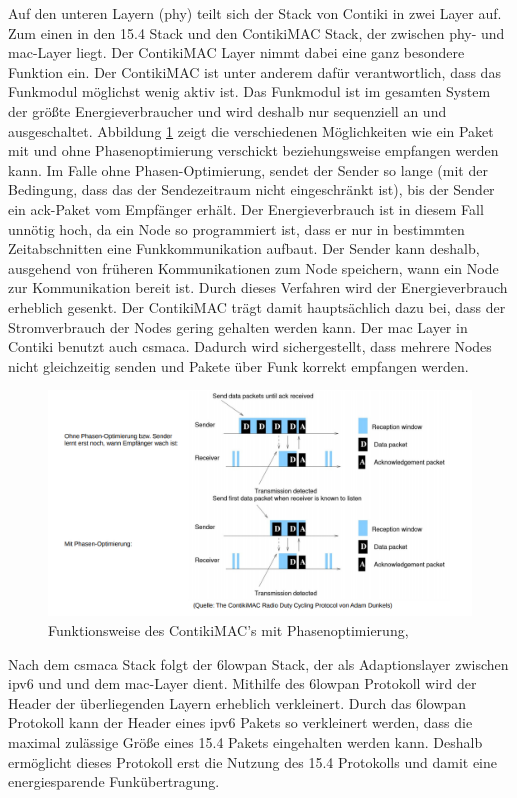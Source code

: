 	Auf den unteren Layern (\ac{phy}) teilt sich der Stack von Contiki in zwei Layer auf. Zum einen in den \ac{15.4} Stack und den ContikiMAC Stack, der zwischen \ac{phy}- und \ac{mac}-Layer liegt. Der ContikiMAC Layer nimmt dabei eine ganz besondere Funktion ein. Der ContikiMAC ist unter anderem dafür verantwortlich, dass das Funkmodul möglichst wenig aktiv ist. Das Funkmodul ist im gesamten System der größte Energieverbraucher und wird deshalb nur sequenziell an und ausgeschaltet. Abbildung \ref{ContikiMAC} zeigt die verschiedenen Möglichkeiten wie ein Paket mit und ohne Phasenoptimierung verschickt beziehungsweise empfangen werden kann. Im Falle ohne Phasen-Optimierung, sendet der Sender so lange (mit der Bedingung, dass das der Sendezeitraum nicht eingeschränkt ist), bis der Sender ein \ac{ack}-Paket vom Empfänger erhält. Der Energieverbrauch ist in diesem Fall unnötig hoch, da ein Node so programmiert ist, dass er nur in bestimmten Zeitabschnitten eine Funkkommunikation aufbaut. Der Sender kann deshalb, ausgehend von früheren Kommunikationen zum Node speichern, wann ein Node zur Kommunikation bereit ist. Durch dieses Verfahren wird der Energieverbrauch erheblich gesenkt. Der ContikiMAC trägt damit hauptsächlich dazu bei, dass der Stromverbrauch der Nodes gering gehalten werden kann. Der \ac{mac} Layer in Contiki benutzt auch \ac{csmaca}. Dadurch wird sichergestellt, dass mehrere Nodes nicht gleichzeitig senden und Pakete über Funk korrekt empfangen werden. \\
	\begin{figure}
		\centering
		\includegraphics[scale=0.5]{Grafiken-Julian/ContikiMAC.png}
		\caption{Funktionsweise des ContikiMAC's mit Phasenoptimierung, \cite{dunkelsmac}}
		\label{ContikiMAC}
	\end{figure}
	Nach dem \ac{csmaca} Stack folgt der \ac{6lowpan} Stack, der als Adaptionslayer zwischen \ac{ipv6} und und dem \ac{mac}-Layer dient. Mithilfe des \ac{6lowpan} Protokoll wird der Header der überliegenden Layern erheblich verkleinert. Durch das \ac{6lowpan} Protokoll kann der Header eines \ac{ipv6} Pakets so verkleinert werden, dass die maximal zulässige Größe eines \ac{15.4} Pakets eingehalten werden kann. Deshalb ermöglicht dieses Protokoll erst die Nutzung des \ac{15.4} Protokolls und damit eine energiesparende Funkübertragung.\\
